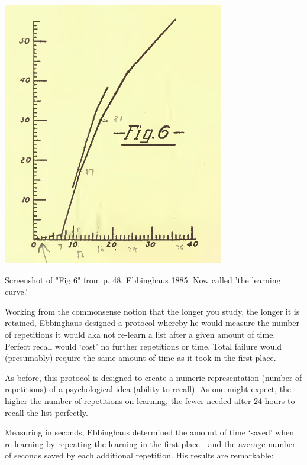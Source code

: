 \begin{refsection}
\begin{marginfigure}
\begin{center}
     \includegraphics[scale=0.5]{../images/ebbinghausFig6.png}
\end{center}
 \caption{Screenshot of "Fig 6" from p. 48, Ebbinghaus 1885. Now called 'the learning curve.'}
\label{fig: ebbinghaus6}
\end{marginfigure}


 Working from the commonsense notion that the longer you study, the longer it is retained, Ebbinghaus designed a protocol whereby he would measure the number of repetitions it would aka not re-learn a list after a given amount of time. Perfect recall would `cost' no further repetitions or time. Total failure would (presumably) require the same amount of time as it took in the first place.

As before, this protocol is designed to create a numeric representation (number of repetitions) of a psychological idea (ability to recall). As one might expect, the higher the number of repetitions on learning, the fewer needed after 24 hours to recall the list perfectly.

Measuring in seconds, Ebbinghaus determined the amount of time `saved' when re-learning by repeating the learning in the first place---and the average number of seconds saved by each additional repetition. His results are remarkable:
\begin{marginfigure}
 \begin{center}


\end{center}
\end{marginfigure}
\end{refsection}
